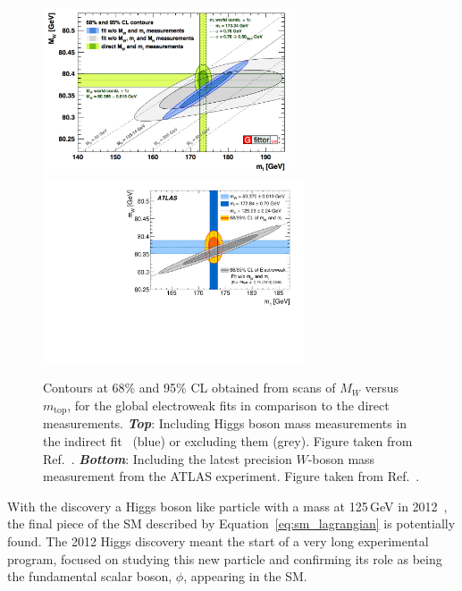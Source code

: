 \begin{figure}[!htb]
    \begin{center}
        \includegraphics[width=0.65\textwidth]{figures/chapter1/sm_final/mw_vs_mt_indirect}
        \includegraphics[width=0.69\textwidth]{figures/chapter1/sm_final/atlas_w_boson_mass_mw_mt}
        \caption{
            Contours at 68\% and 95\% CL obtained from scans of $M_W$ versus $m_{\text{top}}$,
            for the global electroweak fits in comparison to the direct measurements.
            \textit{\textbf{Top}}: Including Higgs boson mass measurements in the indirect fit~\cite{HMassATLAS,HMassCMS} (blue)
                or excluding them (grey). Figure taken from Ref.~\cite{GFitter}.
            \textit{\textbf{Bottom}}: Including the latest precision $W$-boson mass measurement from the ATLAS
                experiment. Figure taken from Ref.~\cite{ATLASWMass}.
        }
        \label{fig:mw_mt_scan}
    \end{center}
\end{figure}

With the discovery a Higgs boson like particle with a mass at 125\,GeV in 2012~\cite{HDiscoveryATLAS,HDiscoveryCMS},
the final piece of the SM described by Equation~\ref{eq:sm_lagrangian} is potentially found.
The 2012 Higgs discovery meant the start of a very long experimental program, focused
on studying this new particle and confirming its role as being the fundamental scalar boson, $\phi$,
appearing in the SM.

